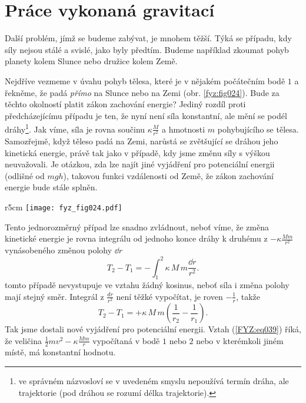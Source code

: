 {  \section{Práce vykonaná gravitací}
    Další problém, jímž se budeme zabývat, je mnohem těžší. Týká se případu, kdy síly nejsou stálé 
    a svislé, jako byly předtím. Budeme například zkoumat pohyb planety kolem Slunce nebo družice 
    kolem Země.
    
    Nejdříve vezmeme v úvahu pohyb tělesa, které je v nějakém počátečním bodě \(1\) a řekněme, že 
    padá \emph{přímo} na Slunce nebo na Zemi (obr. \ref{fyz:fig024}). Bude za těchto okolností 
    platit zákon zachování energie? Jediný rozdíl proti předcházejícímu případu je ten, že nyní 
    není síla konstantní, ale mění se podél dráhy\footnote{ve správném názvosloví se v uvedeném 
    smyslu nepoužívá termín dráha, ale trajektorie (pod dráhou se rozumí délka trajektorie).}. Jak 
    víme, síla je rovna součinu \(\kappa\frac{M}{r^2}\) a hmotnosti \(m\) pohybujícího se tělesa. 
    Samozřejmě, když těleso padá na Zemi, narůstá se zvětšující se dráhou jeho kinetická energie, 
    právě tak jako v případě, kdy jsme změnu síly s výškou neuvažovali. Je otázkou, zda lze najít 
    jiné vyjádření pro potenciální energii (odlišné od \(mgh\)), takovou funkci vzdálenosti od 
    Země, že zákon zachování energie bude stále splněn.
    
    \begin{wrapfigure}[8]{r}{5cm}  %
      \centering
      \texttt{[image: fyz\_fig024.pdf]}
      \caption{Těleso o malé hmotnosti \(m\) padá pod vlivem gravitace na těleso o velké hmotností 
               \(M\) (\cite[s.~188]{Feynman01})}
      \label{fyz:fig024}
    \end{wrapfigure}
    Tento jednorozměrný případ lze snadno zvládnout, neboť víme, že změna kinetické energie je 
    rovna integrálu od jednoho konce dráhy k druhému z  \(-\kappa\frac{Mm}{r^2}\) vynásobeného 
    změnou polohy \(\dd{r}\)
    \begin{equation}\label{FYZ:eq038}
      T_2 - T_1 = -\int_{1}^{2}\kappa\,M\,m\frac{\dd{r}}{r^2}.
    \end{equation}
    tomto případě nevystupuje ve vztahu žádný kosinus, neboť síla i změna polohy mají stejný směr. 
    Integrál z \(\frac{dr}{r^2}\) není těžké vypočítat, je roven \(-\frac{1}{r}\), takže
    \begin{equation}\label{FYZ:eq039}
      T_2 - T_1 = +\kappa\,M\,m\left(\dfrac{1}{r_2} - \dfrac{1}{r_1}\right).
    \end{equation}
    Tak jsme dostali nové vyjádření pro potenciální energii. Vztah (\ref{FYZ:eq039}) říká, že 
    veličina \(\frac{1}{2}mv^2 - \kappa\frac{Mm}{r}\) vypočítaná v bodě \(1\) nebo \(2\) nebo v 
    kterémkoli jiném místě, má konstantní hodnotu.
    
}
